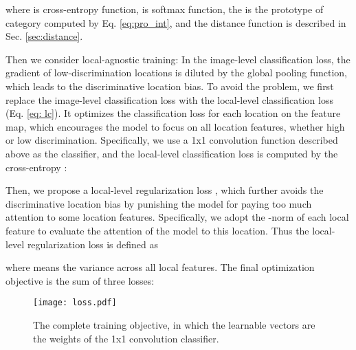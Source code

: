 \documentclass{article}
\begin{document}
where  is cross-entropy function,  is softmax function, the  is the prototype of category  computed by Eq. \ref{eq:pro_int}, and the distance function  is described in Sec. \ref{sec:distance}.

Then we consider local-agnostic training: In the image-level classification loss, the gradient of low-discrimination locations is diluted by the global pooling function, which leads to the discriminative location bias. To avoid the problem, we first replace the image-level classification loss with the local-level classification loss (Eq. \ref{eq: lc}). It optimizes the classification loss for each location on the feature map, which encourages the model to focus on all location features, whether high or low discrimination. Specifically, we use a 1x1 convolution function described above as the classifier, and the local-level classification loss is computed by the cross-entropy :



Then, we propose a local-level regularization loss , which further avoids the discriminative location bias by punishing the model for paying too much attention to some location features. Specifically, we adopt the -norm of each local feature to evaluate the attention of the model to this location. Thus the local-level regularization loss is defined as


where  means the variance across all local features. The final optimization objective is the sum of three losses:




\begin{figure}[t]
	\begin{center}
	    \vspace{-10pt}
		\texttt{[image: loss.pdf]}
	\end{center}
	\vspace{-15pt}
	\caption{ The complete training objective, in which the learnable vectors are the weights of the 1x1 convolution classifier. }
	\label{fig:loss}
	\vspace{-8pt}
\end{figure}
\end{document}
